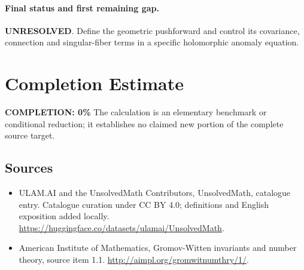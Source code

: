 \documentclass[11pt]{article}
\begin{document}
\paragraph{Final status and first remaining gap.}
\textbf{UNRESOLVED}. Define the geometric pushforward and control its covariance, connection and singular-fiber terms in a specific holomorphic anomaly equation.

\section{Completion Estimate}
\noindent\textbf{COMPLETION: 0\%}
The calculation is an elementary benchmark or conditional reduction; it establishes no claimed new portion of the complete source target.

\subsection{Sources}
\begin{itemize}
\item[\hypertarget{source:statement:1}{S1}] ULAM.AI and the UnsolvedMath Contributors, UnsolvedMath, catalogue entry. Catalogue curation under CC BY 4.0; definitions and English exposition added locally.
\url{https://huggingface.co/datasets/ulamai/UnsolvedMath}.
\item[\hypertarget{source:statement:2}{S2}] American Institute of Mathematics, Gromov-Witten invariants and number theory, source item 1.1.
\url{http://aimpl.org/gromwitnumthry/1/}.
\end{itemize}
\label{end:statement}
\end{document}

